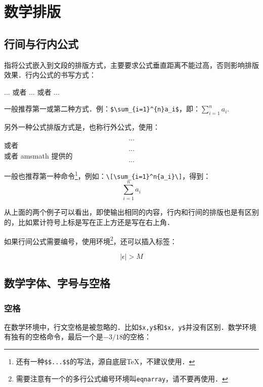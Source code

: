 \chapter{数学排版}
\section{行间与行内公式}
指将公式嵌入到文段的排版方式，主要要求公式垂直距离不能过高，否则影响排版效果．行内公式的书写方式：
\begin{latex}
$...$ 或者 \(...\) 或者 \begin{math}...\end{math}
\end{latex}

一般推荐第一或第二种方式．例：\verb|$\sum_{i=1}^{n}a_i$|，即：$\sum_{i=1}^{n}a_i$.

另外一种公式排版方式是，也称行外公式，使用：
\begin{latex}
\[...\] 或者 \begin{displaymath}...\end{displaymath}
或者 amsmath 提供的 \begin{equation*}...\end{equation*}
\end{latex}

一般也推荐第一种命令\footnote{还有一种\texttt{\$\$...\$\$}的写法，源自底层\TeX，不建议使用．}，例如：\verb|\[\sum_{i=1}^n{a_i}\]|，得到：
\[\sum_{i=1}^{n}a_i\]

从上面的两个例子可以看出，即使输出相同的内容，行内和行间的排版也是有区别的，比如累计符号上标是写在正上方还是写在右上角．

如果行间公式需要编号，使用环境\footnote{需要注意有一个的多行公式编号环境叫\texttt{eqnarray}，请不要再使用．}，还可以插入标签：

\begin{codeshow}
\begin{equation}
\label{eq:NoExample}
  |\epsilon|>M
\end{equation}
\end{codeshow}

\section{数学字体、字号与空格}
\label{sec:mathfont}
\subsection{空格}
在数学环境中，行文空格是被忽略的．比如\verb|$x,y$|和\verb|$x, y$|并没有区别．数学环境有独有的空格命令，最后一个是$-3/18$的空格：

